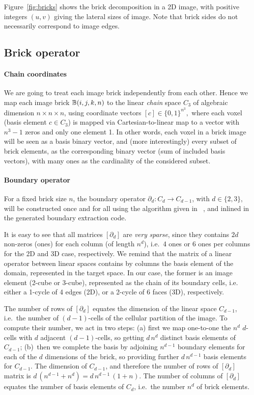 Figure~\ref{fig:bricks} shows the brick decomposition in a 2D image, with positive integers $(u,v)$ giving the lateral sizes of image. Note that brick sides do not necessarily correspond to image edges. 


\subsection{Brick operator }\label{sec:brick}

\paragraph{Chain coordinates }\label{sec:chain-coords}
We are going to treat each image brick independently from each other. Hence we map each image brick $\mathbb{B}(i,j,k,n)$ to the linear \emph{chain} space $C_3$ of algebraic dimension $n\times n\times n$, using coordinate vectors $[c] \in \{0,1\}^{n^3},$ where each voxel (basis element $c \in C_3$) is mapped via Cartesian-to-linear map to a vector with $n^3-1$ zeros and only one element 1.
In other words, each voxel in a brick image will be seen as a basis binary vector, and (more interestingly) every subset of brick elements, as the corresponding binary vector (sum of included basis vectors), with many ones as the cardinality of the considered  subset.

\paragraph{Boundary operator }\label{sec:boundary-operator}
For a fixed brick size $n$, the boundary operator $\partial_d : C_d\to C_{d-1}$, with $d\in\{2,3\}$, will be constructed once and for all using the algorithm given in~
\cite{TSAS}, 
and inlined in the generated boundary extraction code.

It is easy to see that all matrices $[\partial_d]$ are \emph{very sparse}, since they contains $2d$ non-zeros (ones) for each column (of length $n^d$), i.e.~4 ones or 6 ones per columns for the 2D and 3D case, respectively. We remind that the matrix of a linear operator between linear spaces contains by columns the basis element of the domain, represented in the target space. In our case, the former is an image element (2-cube or 3-cube), represented as the chain of its boundary cells, i.e. either a 1-cycle of 4 edges (2D), or  a 2-cycle of 6 faces (3D), respectively.  

The number of rows of $[\partial_d]$ equates the dimension of the linear space $C_{d-1}$, i.e.~the number of $(d-1)$-cells of the cellular partition of the image. To compute their number, we act in two steps: (a) first we map one-to-one the $n^d$ $d$-cells with $d$ adjacent $(d-1)$-cells, so getting $d\,n^d$ distinct basis elements of $C_{d-1}$; (b)~then we complete the basis by adjoining $n^{d-1}$ boundary elements for each of the $d$ dimensions of the brick, so providing further $d\,n^{d-1}$ basis elements for $C_{d-1}$. The dimension of $C_{d-1}$, and therefore the number of rows of $[\partial_d]$ matrix is $d\,(n^{d-1}+n^{d}) = d\,n^{d-1}\,(1+n)$. The number of columns of $[\partial_d]$ equates the number of basis elements of $C_d$, i.e.~the number $n^d$ of brick elements.

